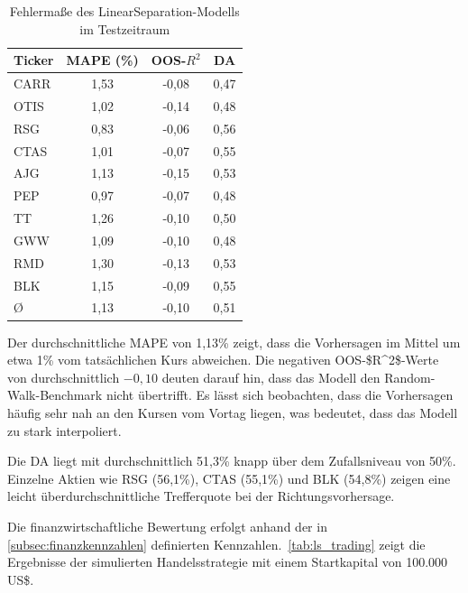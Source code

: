 \begin{table}[htbp]
    \centering
    \begin{tabular}{l S[table-format=1.2] S[table-format=-1.2] S[table-format=1.2]}
        \toprule
        Ticker & {MAPE (\%)} & {OOS-$R^2$} & {DA} \\
        \midrule
        CARR   & 1,53        & -0,08       & 0,47 \\
        OTIS   & 1,02        & -0,14       & 0,48 \\
        RSG    & 0,83        & -0,06       & 0,56 \\
        CTAS   & 1,01        & -0,07       & 0,55 \\
        AJG    & 1,13        & -0,15       & 0,53 \\
        PEP    & 0,97        & -0,07       & 0,48 \\
        TT     & 1,26        & -0,10       & 0,50 \\
        GWW    & 1,09        & -0,10       & 0,48 \\
        RMD    & 1,30        & -0,13       & 0,53 \\
        BLK    & 1,15        & -0,09       & 0,55 \\
        \midrule
        \O     & 1,13        & -0,10       & 0,51 \\
        \bottomrule
    \end{tabular}
    \caption{Fehlermaße des LinearSeparation-Modells im Testzeitraum}\label{tab:ls_fehler}
\end{table}

Der durchschnittliche \ac{MAPE} von 1,13\% zeigt, dass die Vorhersagen im Mittel um etwa 1\% vom tatsächlichen Kurs abweichen. Die negativen \ac{OOS-$R^2$}-Werte von durchschnittlich $-0,10$ deuten darauf hin, dass das Modell den Random-Walk-Benchmark nicht übertrifft. Es lässt sich beobachten, dass die Vorhersagen häufig sehr nah an den Kursen vom Vortag liegen, was bedeutet, dass das Modell zu stark interpoliert.

Die \ac{DA} liegt mit durchschnittlich 51,3\% knapp über dem Zufallsniveau von 50\%. Einzelne Aktien wie RSG (56,1\%), CTAS (55,1\%) und BLK (54,8\%) zeigen eine leicht überdurchschnittliche Trefferquote bei der Richtungsvorhersage.

Die finanzwirtschaftliche Bewertung erfolgt anhand der in \cref{subsec:finanzkennzahlen} definierten Kennzahlen.~\cref{tab:ls_trading} zeigt die Ergebnisse der simulierten Handelsstrategie mit einem Startkapital von 100.000 US\$.

